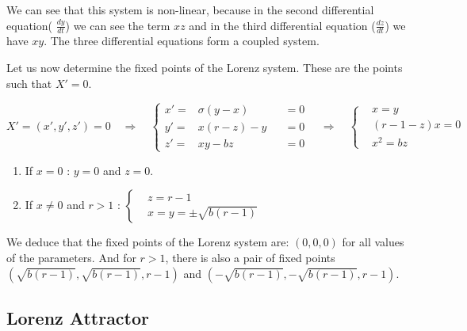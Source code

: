 \documentclass[12pt]{article}
\begin{document}
	\noindent We can see that this system is non-linear, because in the second differential equation( $\frac{dy}{dt}$) we can see the term $xz$ and in the third differential equation ($\frac{dz}{dt}$) we have $xy$. The three differential equations form a coupled system. 
	
	\noindent Let us now determine the fixed points of the Lorenz system. These are the points such that $X'=0$. 
	
	$$
	X'=(x',y',z')=0
	\quad \Rightarrow \quad 
	\left\{\begin{aligned}
		x'=&\sigma(y-x) &&=0 \\
		y'=&x(r-z)-y  &&=0\\
		z'=&xy-bz &&=0
	\end{aligned}\right. 
	\quad \Rightarrow \quad 
	\left\{\begin{aligned}
		&x=y \\
		&(r-1-z)x=0\\
		&x^2=bz
	\end{aligned}\right.
	$$
	
	\begin{enumerate}[label=\textbullet]
		\item If $x=0$ : \quad  $y=0$ and $z=0$.
		\item If $x\ne 0$ and $r>1$ : \quad $\left\{\begin{aligned}
			&z=r-1\\
			&x=y=\pm\sqrt{b(r-1)}
		\end{aligned}\right.
		$
	\end{enumerate}
	
	\noindent We deduce that the fixed points of the Lorenz system are: $(0,0,0)$ for all values of the parameters. And for $r>1$, there is also a pair of fixed points $(\sqrt{b(r-1)},\sqrt{b(r-1)},r-1)$ and $(-\sqrt{b(r-1)},-\sqrt{b(r-1)},r-1)$.
	
	\subsection{Lorenz Attractor}
	
\end{document}
